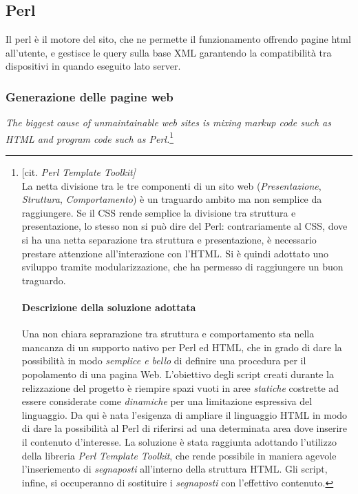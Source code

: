 \subsection{Perl}
Il perl \`e il motore del sito, che ne permette il funzionamento offrendo pagine html all'utente, e gestisce le query sulla base XML garantendo la compatibilit\`a tra dispositivi in quando eseguito lato server.
\subsubsection{Generazione delle pagine web}
\textit{The biggest cause of unmaintainable web sites is mixing markup code such as HTML and program code such as Perl.}\footnote{[cit. \textit{Perl Template Toolkit]}\\

La netta divisione tra le tre componenti di un sito web (\textit{Presentazione}, \textit{Struttura}, \textit{Comportamento}) \`e un traguardo ambito ma non semplice da raggiungere. Se il CSS rende semplice la divisione tra struttura e presentazione, lo stesso non si pu\`o dire del Perl: contrariamente al CSS, dove si ha una netta separazione tra struttura e presentazione, \`e necessario prestare attenzione all'interazione con l'HTML. Si \`e quindi adottato uno sviluppo tramite modularizzazione, che ha permesso di raggiungere un buon traguardo.

\paragraph*{Descrizione della soluzione adottata}Una non chiara seprarazione tra struttura e comportamento sta nella mancanza di un supporto nativo per Perl ed HTML, che in grado di dare la possibilit\`a in modo \textit{semplice e bello} di definire una procedura per il popolamento di una pagina Web. L'obiettivo degli script creati durante la relizzazione del progetto \`e riempire spazi vuoti in aree \textit{statiche} costrette ad essere considerate come \textit{dinamiche} per una limitazione espressiva del linguaggio. Da qui \`e nata l'esigenza di ampliare il linguaggio HTML in modo di dare la possibilit\`a al Perl di riferirsi ad una determinata area dove inserire il contenuto d'interesse. La soluzione \`e stata raggiunta adottando l'utilizzo della libreria \textit{Perl Template Toolkit}, che rende possibile in maniera agevole l'inseriemento di \textit{segnaposti} all'interno della struttura HTML. Gli script, infine, si occuperanno di sostituire i \textit{segnaposti} con l'effettivo contenuto.
}
